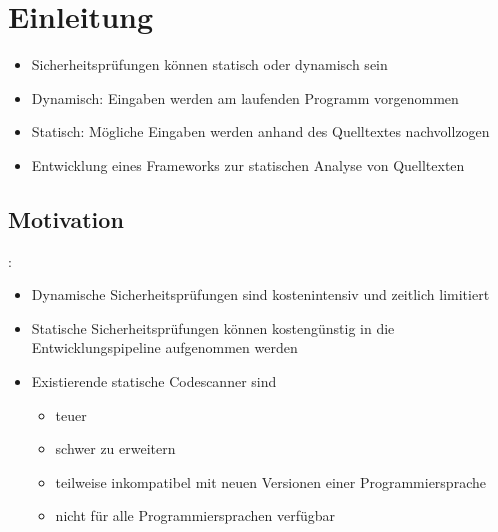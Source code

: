 \section{Einleitung}
    \begin{frame}{\secname}
        \begin{itemize}
            \item Sicherheitsprüfungen können statisch oder dynamisch sein
            \item Dynamisch: Eingaben werden am laufenden Programm vorgenommen
            \item Statisch: Mögliche Eingaben werden anhand des Quelltextes nachvollzogen
            \item Entwicklung eines Frameworks zur statischen Analyse von Quelltexten
        \end{itemize}
    \end{frame}

    \subsection{Motivation}
        \begin{frame}{\secname: \subsecname}
            \begin{itemize}
                \item Dynamische Sicherheitsprüfungen sind kostenintensiv und zeitlich limitiert
                \item Statische Sicherheitsprüfungen können kostengünstig in die Entwicklungspipeline aufgenommen werden
                \item Existierende statische Codescanner sind
                    \begin{itemize}
                        \item teuer
                        \item schwer zu erweitern
                        \item teilweise inkompatibel mit neuen Versionen einer Programmiersprache
                        \item nicht für alle Programmiersprachen verfügbar
                    \end{itemize}
            \end{itemize}
        \end{frame}
